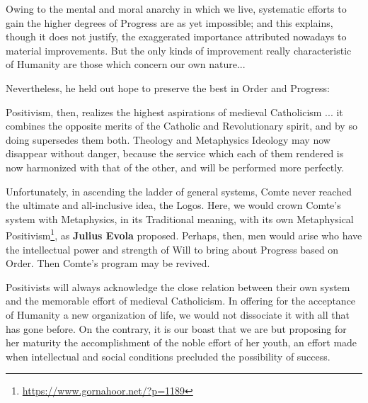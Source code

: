 \begin{quotex}
Owing to the mental and moral anarchy in which we live, systematic efforts to gain the higher degrees of Progress are as yet impossible; and this explains, though it does not justify, the exaggerated importance attributed nowadays to material improvements. But the only kinds of improvement really characteristic of Humanity are those which concern our own nature... 
\end{quotex}


Nevertheless, he held out hope to preserve the best in Order and Progress:

Positivism, then, realizes the highest aspirations of medieval Catholicism ... it combines the opposite merits of the Catholic and Revolutionary spirit, and by so doing supersedes them both. Theology and Metaphysics Ideology may now disappear without danger, because the service which each of them rendered is now harmonized with that of the other, and will be performed more perfectly.

Unfortunately, in ascending the ladder of general systems, Comte never reached the ultimate and all-inclusive idea, the Logos. Here, we would crown Comte's system with Metaphysics, in its Traditional meaning, with its own Metaphysical Positivism\footnote{\url{https://www.gornahoor.net/?p=1189}}, as \textbf{Julius Evola} proposed. Perhaps, then, men would arise who have the intellectual power and strength of Will to bring about Progress based on Order. Then Comte's program may be revived.

\begin{quotex}
Positivists will always acknowledge the close relation between their own system and the memorable effort of medieval Catholicism. In offering for the acceptance of Humanity a new organization of life, we would not dissociate it with all that has gone before. On the contrary, it is our boast that we are but proposing for her maturity the accomplishment of the noble effort of her youth, an effort made when intellectual and social conditions precluded the possibility of success.
\end{quotex}




